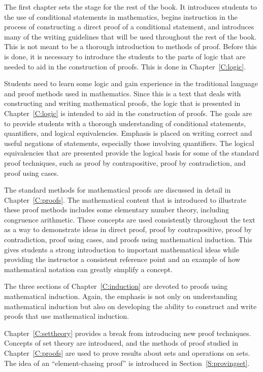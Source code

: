 The first chapter sets the stage for the rest of the book.  It introduces students to the use of conditional statements in mathematics, begins instruction in the process of constructing a direct proof of a conditional statement, and introduces many of the writing guidelines that will be used throughout the rest of the book.  This is not meant to be a thorough introduction to methods of proof.  Before this is done, it is necessary to introduce the students to the parts of logic that are needed to aid in the construction of proofs.  This is done in 
Chapter~\ref{C:logic}.  

Students need to learn some logic and gain experience in the traditional language and proof methods used in mathematics. Since this is a text that deals with constructing and writing mathematical proofs, the logic that is presented in Chapter~\ref{C:logic} is intended to aid in the construction of proofs.  The goals are to provide students with a thorough understanding of conditional statements, quantifiers, and logical equivalencies.  Emphasis is placed on writing correct and useful negations of statements, especially those involving quantifiers.  The logical equivalencies that are presented provide the logical basis for some of the standard proof techniques, such as proof by contrapositive, proof by contradiction, and proof using cases.

The standard methods for mathematical proofs are discussed in detail in Chapter~\ref{C:proofs}.  The mathematical content that is introduced to illustrate these proof methods includes some elementary number theory, including congruence arithmetic.  These concepts are used consistently throughout the text as a way to demonstrate ideas in direct proof, proof by contrapositive, proof by contradiction, proof using cases, and proofs using mathematical induction.  This gives students a strong introduction to important mathematical ideas while providing the instructor a consistent reference point and an example of how mathematical notation can greatly simplify a concept.

The three sections of Chapter~\ref{C:induction} are devoted to proofs using mathematical induction.  Again, the emphasis is not only on understanding mathematical induction but also on developing the ability to construct and write proofs that use mathematical induction.

Chapter~\ref{C:settheory} provides a break from introducing new proof techniques.  Concepts of set theory are introduced, and the methods of proof studied in Chapter~\ref{C:proofs} are used to prove results about sets and operations on sets.  The idea of an ``element-chasing proof'' is introduced in Section~\ref{S:provingset}.


